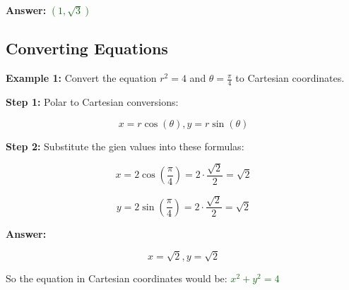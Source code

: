 \documentclass[10pt]{article}                               %
\begin{document}
\begin{adjustwidth}{2em}{0pt}
\begin{adjustwidth}{2em}{0pt}
\begin{examplebox}
\begin{adjustwidth}{2em}{0pt}
                \textbf{Answer:} \textcolor{darkgreen}{\( \left(1,\sqrt{3}\right) \)}

            \end{adjustwidth}

        \end{examplebox}

        \break

        \begin{examplebox}
        
            \subsection*{Converting Equations}

            \textbf{Example 1:} Convert the equation \( r^2 = 4 \) and \( \theta = \frac{\pi}{4} \) to Cartesian coordinates.
            \vspace{0.5em}

            \begin{adjustwidth}{2em}{0pt}

                \textbf{Step 1:} Polar to Cartesian conversions:

                \vspace{0.25em}

                \[ x = r\cos(\theta), y = r\sin(\theta) \]

                \vspace{0.5em}

                \textbf{Step 2:} Substitute the gien values into these formulas:

                \vspace{0.25em}

                \[ x = 2\cos\left(\frac{\pi}{4}\right) = 2 \cdot \frac{\sqrt{2}}{2} = \sqrt{2} \]

                \[ y = 2\sin\left(\frac{\pi}{4}\right) = 2 \cdot \frac{\sqrt{2}}{2} = \sqrt{2} \]

                \vspace{0.5em}

                \textbf{Answer:}

                \vspace{0.25em}

                \[ x = \sqrt{2}, y = \sqrt{2} \]

                \vspace{0.5em}

                So the equation in Cartesian coordinates would be:
                \textcolor{darkgreen}{\( x^2 + y^2 = 4 \)}


\end{adjustwidth}
\end{examplebox}
\end{adjustwidth}
\end{adjustwidth}
\end{document}
